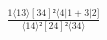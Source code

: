 \documentclass[varwidth, border=5pt]{standalone}
\begin{document}
\begin{my}
$\begin{gathered}
\scriptscriptstyle\frac{1⟨13⟩[34]²⟨4|1+3|2]}{⟨14⟩²[24]²⟨34⟩}
\end{gathered}$
\end{my}
\end{document}
